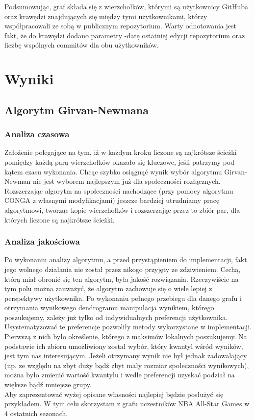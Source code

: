\documentclass{article}
\begin{document}
Podsumowując, graf składa się z wierzchołków, którymi są użytkownicy GitHuba oraz krawędzi znajdujących się między tymi użytkownikami, którzy współpracowali ze sobą w publicznym repozytorium. Warty odnotowania jest fakt, że do krawędzi dodano parametry -datę ostatniej edycji repozytorium oraz liczbę wspólnych commitów dla obu użytkowników.

\section{Wyniki}

\subsection{Algorytm Girvan-Newmana}
\subsubsection{Analiza czasowa}
Założenie polegające na tym, iż w każdym kroku liczone są najkrótsze ścieżki pomiędzy każdą parą wierzchołków okazało się kluczowe, jeśli patrzymy pod kątem czasu wykonania. Chcąc szybko osiągnąć wynik wybór algorytmu Girvan-Newman nie jest wyborem najlepszym już dla społeczności rozłącznych. Rozszerzając algorytm na społeczności nachodzące (przy pomocy algorytmu CONGA z własnymi modyfikacjami) jeszcze bardziej utrudniamy pracę algorytmowi, tworząc kopie wierzchołków i rozszerzając przez to zbiór par, dla których liczone są najkrótsze ścieżki.

\subsubsection{Analiza jakościowa}
Po wykonaniu analizy algorytmu, a przed przystąpieniem do implementacji, fakt jego wolnego działania nie został przez nikogo przyjęty ze zdziwieniem. Cechą, którą miał obronić się ten algorytm, była jakość rozwiązania. Rzeczywiście na tym polu można zauważyć, że algorytm zachowuje się o wiele lepiej z perspektywy użytkownika. Po wykonaniu pełnego przebiegu dla danego grafu i otrzymania wynikowego dendrogramu manipulacja wynikiem, którego poszukujemy, zależy już tylko od indywidualnych preferencji użytkownika.\\
Usystematyzować te preferencje pozwoliły metody wykorzystane w implementacji. Pierwszą z nich było określenie, którego z maksimów lokalnych poszukujemy. Na podstawie ich zbioru umożliwiony został wybór, który kwantyl wśród wyników, jest tym nas interesującym. Jeżeli otrzymany wynik nie był jednak zadowalający (np. ze względu na zbyt duży bądź zbyt mały rozmiar społeczności wynikowych), można było zmienić wartość kwantylu i wedle preferencji uzyskać podział na większe bądź mniejsze grupy.\\
Aby zaprezentować wyżej opisane własności najlepiej będzie posłużyć się przykładem. W tym celu skorzystam z grafu uczestników NBA All-Star Games w 4 ostatnich sezonach.
\end{document}
